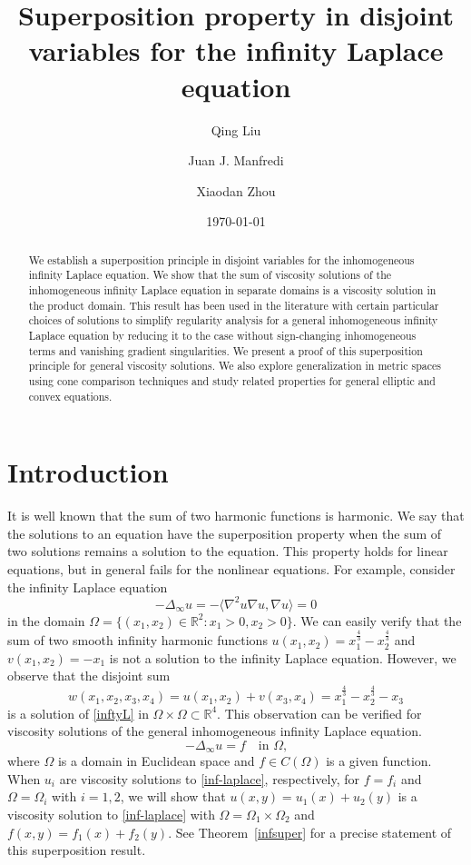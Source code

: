 \documentclass[12pt, reqno]{amsart}
\title[Superposition in disjoint variables]{Superposition property in disjoint variables for the infinity Laplace equation}
\author[Q. Liu]{Qing Liu}
\author[J. J. Manfredi]{Juan J. Manfredi}
\author[X. Zhou]{Xiaodan Zhou}
\date{\today}
\begin{document}
\begin{abstract}
We establish a superposition principle in disjoint variables for the inhomogeneous infinity Laplace equation. We show that the sum of viscosity solutions of the inhomogeneous infinity Laplace equation in separate domains is a viscosity solution in the product domain. This result has been used in the literature with certain particular choices of solutions to simplify regularity analysis for a general inhomogeneous infinity Laplace equation by reducing it to the case without sign-changing inhomogeneous terms and vanishing gradient singularities. We present a proof of this superposition principle for general viscosity solutions. We also explore generalization in metric spaces using cone comparison techniques and study related properties for general elliptic and convex equations. 
\end{abstract}




\maketitle
 

\section{Introduction}
It is well known that the sum of two harmonic functions is harmonic. We say that the solutions to an equation have the superposition property when the sum of two solutions remains a solution to the equation. This property holds for linear equations, but in general fails for the nonlinear equations. For example, consider the infinity Laplace equation 
\begin{equation}\label{inftyL}
    -\Delta_\infty u=-\langle\nabla^2 u\nabla u, \nabla u\rangle=0
\end{equation}
in the domain $\Omega=\{(x_1, x_2)\in \mathbb{R}^2: x_1>0, x_2>0\}$. We can easily verify that the sum of two smooth infinity harmonic functions $u(x_1, x_2)=x_1^{\frac{4}{3}}-x_2^{\frac{4}{3}}$ and $v(x_1, x_2)=-x_1$ is not a solution to the infinity Laplace equation. However, we observe that the disjoint sum 
\[
w(x_1, x_2, x_3, x_4)=u(x_1, x_2)+v(x_3, x_4) =x_1^{\frac{4}{3}}-x_2^{\frac{4}{3}}-x_3
\]
is a solution of \eqref{inftyL} in $\Omega\times \Omega\subset \mathbb{R}^4$. This observation can be verified for viscosity solutions of the general inhomogeneous infinity Laplace equation.
\begin{equation}\label{inf-laplace}
    -\Delta_\infty u=f \quad \text{in $\Omega$,}
\end{equation}
where $\Omega$ is a domain in Euclidean space and $f\in C(\Omega)$ is a given function. When $u_i$ are viscosity solutions to \eqref{inf-laplace}, respectively, for $f=f_i$ and $\Omega=\Omega_i$ with $i=1, 2$, we will show that $u(x, y)=u_1(x)+u_2(y)$ is a viscosity solution to \eqref{inf-laplace} with $\Omega=\Omega_1\times \Omega_2$ and $f(x,y)=f_1(x)+f_2(y)
$. See Theorem~\ref{infsuper} for a precise statement of this superposition result.
\end{document}
